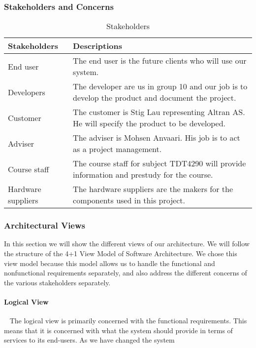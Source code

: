 \documentclass[../document]{subfiles}
\begin{document}
\subsubsection{Stakeholders and Concerns}
\begin{table}[H]
	\caption{Stakeholders}
	\begin{tabularx}{\textwidth}{|X|X|}
		\hline
		\textbf{Stakeholders}	& \textbf{Descriptions} \\ \hline
		End user				& The end user is the future clients who will use our system.  \\ \hline
		Developers				& The developer are us in group 10 and our job is to develop the product and document the project.  \\ \hline
		Customer				& The customer is Stig Lau representing Altran AS. He will specify the product to be developed.  \\ \hline
		Adviser					& The adviser is Mohsen Anvaari. His job is to act as a project management.  \\ \hline
		Course staff			& The course staff for subject TDT4290 will provide information and prestudy for the course.  \\ \hline
		Hardware suppliers		& The hardware suppliers are the makers for the components used in this project.  \\ \hline
	\end{tabularx}
\end{table}

\subsubsection{Architectural Views}
In this section we will show the different views of our architecture. We will follow the structure of the 4+1 View Model of Software Architecture. We chose this view model because this model allows us to handle the functional and nonfunctional requirements separately, and also address the different concerns of the various stakeholders separately.

\paragraph{Logical View} \ \newline				
The logical view is primarily concerned with the functional requirements. This means that it is concerned with what the system should provide in terms of services to its end-users. As we have changed the system 
\end{document}
